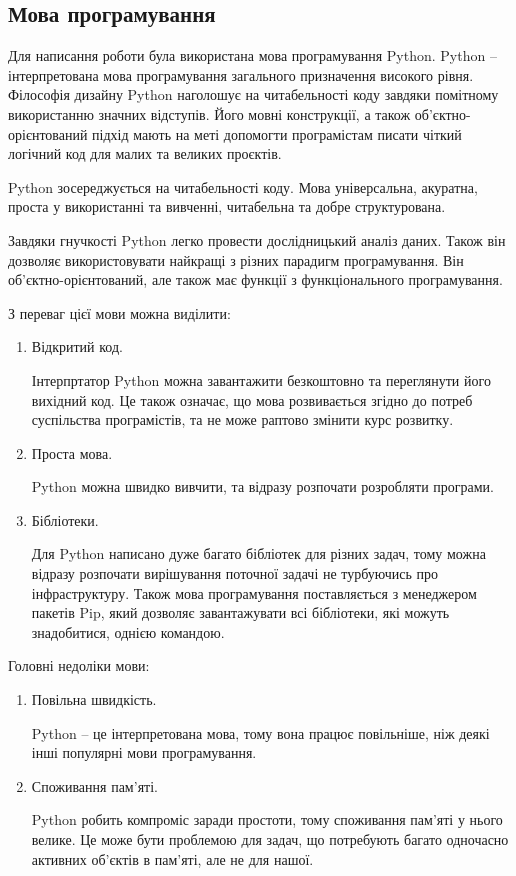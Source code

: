 \documentclass[a4paper,14pt]{extreport}
\begin{document}
\subsection{Мова програмування}
Для написання роботи була використана мова програмування Python. Python -- інтерпретована мова програмування загального призначення високого рівня. Філософія дизайну Python наголошує на читабельності коду завдяки помітному використанню значних відступів. Його мовні конструкції, а також об’єктно-орієнтований підхід мають на меті допомогти програмістам писати чіткий логічний код для малих та великих проєктів.

Python зосереджується на читабельності коду. Мова універсальна, акуратна, проста у використанні та вивченні, читабельна та добре структурована.

Завдяки гнучкості Python легко провести дослідницький аналіз даних. Також він дозволяє використовувати найкращі з різних парадигм програмування. Він об’єктно-орієнтований, але також має функції з функціонального програмування.

З переваг цієї мови можна виділити:
\begin{enumerate}
    \item Відкритий код.

    Інтерпртатор Python можна завантажити безкоштовно та переглянути його вихідний код. Це також означає, що мова розвивається згідно до потреб суспільства програмістів, та не може раптово змінити курс розвитку.

    \item Проста мова.

    Python можна швидко вивчити, та відразу розпочати розробляти програми.

    \item Бібліотеки.

    Для Python написано дуже багато бібліотек для різних задач, тому можна відразу розпочати вирішування поточної задачі не турбуючись про інфраструктуру.
    Також мова програмування поставляється з менеджером пакетів Pip, який дозволяє завантажувати всі бібліотеки, які можуть знадобитися, однією командою.
\end{enumerate}

Головні недоліки мови:
\begin{enumerate}
    \item Повільна швидкість.

    Python -- це інтерпретована мова, тому вона працює повільніше, ніж деякі інші популярні мови програмування.

    \item Споживання пам'яті.

    Python робить компроміс заради простоти, тому споживання пам'яті у нього велике. Це може бути проблемою для задач, що потребують багато одночасно активних об'єктів в пам'яті, але не для нашої.
\end{enumerate}
\end{document}
